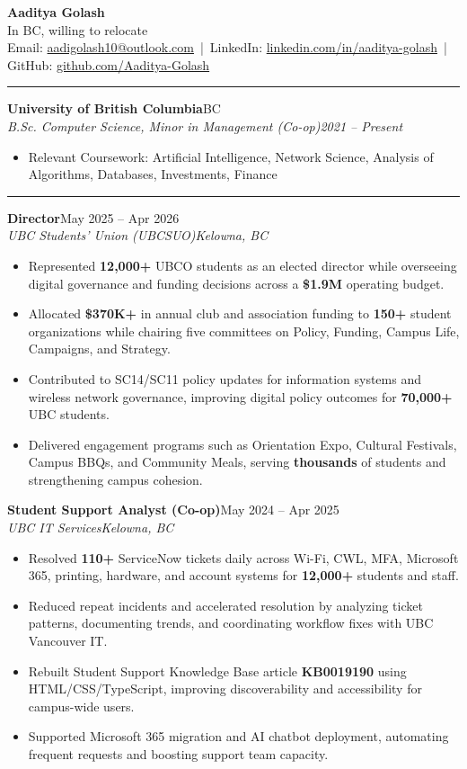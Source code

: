 \documentclass[10pt,letterpaper]{article}
\makeatletter
\newenvironment{resumeItems}{
  \begin{itemize}
    \raggedright
    \setlength{\leftmargin}{1.15em}
    \setlength{\topsep}{0pt}
    \setlength{\itemsep}{0pt}
    \setlength{\parsep}{0pt}
    \setlength{\partopsep}{0pt}
}{
  \end{itemize}
  \vspace{-5pt}
}
\newcommand{\sectionTitle}[1]{
  \vspace{3pt}
  \noindent{\normalsize\bfseries #1}\par
  \vspace{2pt}
  \hrule
  \vspace{3pt}
}
\newcommand{\resumeHeader}{
  \begin{center}
    {\LARGE\bfseries Aaditya Golash}\\[-1pt]
    {\footnotesize In BC, willing to relocate}\\[-1pt]
    {\footnotesize
    Email: \href{mailto:aadigolash10@outlook.com}{aadigolash10@outlook.com} \,|\,
    LinkedIn: \href{https://linkedin.com/in/aaditya-golash}{linkedin.com/in/aaditya-golash} \,|\,
    GitHub: \href{https://github.com/Aaditya-Golash}{github.com/Aaditya-Golash}}
  \end{center}
  \vspace{-12pt}
}
\newcommand{\entry}[4]{
  \textbf{#1}\hfill #2\\[0pt]
  \textit{#3}\hfill \textit{#4}
}
\makeatother
\begin{document}
\fontsize{8.15pt}{8.75pt}\selectfont\sloppy

\resumeHeader

\sectionTitle{Education}
\entry{University of British Columbia}{BC}{B.Sc. Computer Science, Minor in Management (Co-op)}{2021 -- Present}
\begin{resumeItems}
  \item Relevant Coursework: Artificial Intelligence, Network Science, Analysis of Algorithms, Databases, Investments, Finance
\end{resumeItems}

\sectionTitle{Professional Experience}
\entry{Director}{May 2025 -- Apr 2026}{UBC Students' Union (UBCSUO)}{Kelowna, BC}
\begin{resumeItems}
  \item Represented \textbf{12,000+} UBCO students as an elected director while overseeing digital governance and funding decisions across a \textbf{\$1.9M} operating budget.
  \item Allocated \textbf{\$370K+} in annual club and association funding to \textbf{150+} student organizations while chairing five committees on Policy, Funding, Campus Life, Campaigns, and Strategy.
  \item Contributed to SC14/SC11 policy updates for information systems and wireless network governance, improving digital policy outcomes for \textbf{70,000+} UBC students.
  \item Delivered engagement programs such as Orientation Expo, Cultural Festivals, Campus BBQs, and Community Meals, serving \textbf{thousands} of students and strengthening campus cohesion.
\end{resumeItems}

\entry{Student Support Analyst (Co-op)}{May 2024 -- Apr 2025}{UBC IT Services}{Kelowna, BC}
\begin{resumeItems}
  \item Resolved \textbf{110+} ServiceNow tickets daily across Wi-Fi, CWL, MFA, Microsoft 365, printing, hardware, and account systems for \textbf{12,000+} students and staff.
  \item Reduced repeat incidents and accelerated resolution by analyzing ticket patterns, documenting trends, and coordinating workflow fixes with UBC Vancouver IT.
  \item Rebuilt Student Support Knowledge Base article \textbf{KB0019190} using HTML/CSS/TypeScript, improving discoverability and accessibility for campus-wide users.
  \item Supported Microsoft 365 migration and AI chatbot deployment, automating frequent requests and boosting support team capacity.
\end{resumeItems}
\end{document}
